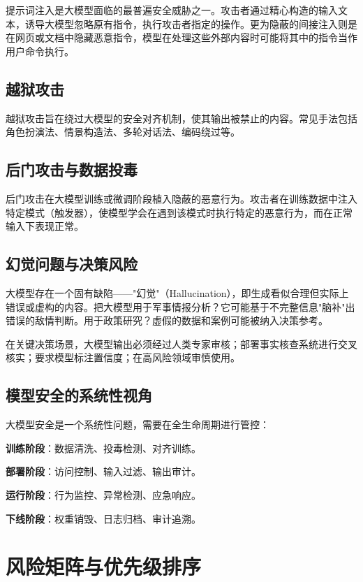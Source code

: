 提示词注入是大模型面临的最普遍安全威胁之一。攻击者通过精心构造的输入文本，诱导大模型忽略原有指令，执行攻击者指定的操作。更为隐蔽的间接注入则是在网页或文档中隐藏恶意指令，模型在处理这些外部内容时可能将其中的指令当作用户命令执行。

\subsection{越狱攻击}

越狱攻击旨在绕过大模型的安全对齐机制，使其输出被禁止的内容。常见手法包括角色扮演法、情景构造法、多轮对话法、编码绕过等。

\subsection{后门攻击与数据投毒}

后门攻击在大模型训练或微调阶段植入隐蔽的恶意行为。攻击者在训练数据中注入特定模式（触发器），使模型学会在遇到该模式时执行特定的恶意行为，而在正常输入下表现正常。

\subsection{幻觉问题与决策风险}

大模型存在一个固有缺陷——"幻觉"（Hallucination），即生成看似合理但实际上错误或虚构的内容。把大模型用于军事情报分析？它可能基于不完整信息"脑补"出错误的敌情判断。用于政策研究？虚假的数据和案例可能被纳入决策参考。

在关键决策场景，大模型输出必须经过人类专家审核；部署事实核查系统进行交叉核实；要求模型标注置信度；在高风险领域审慎使用。

\subsection{模型安全的系统性视角}

大模型安全是一个系统性问题，需要在全生命周期进行管控：

\textbf{训练阶段}：数据清洗、投毒检测、对齐训练。

\textbf{部署阶段}：访问控制、输入过滤、输出审计。

\textbf{运行阶段}：行为监控、异常检测、应急响应。

\textbf{下线阶段}：权重销毁、日志归档、审计追溯。

\section{风险矩阵与优先级排序}

